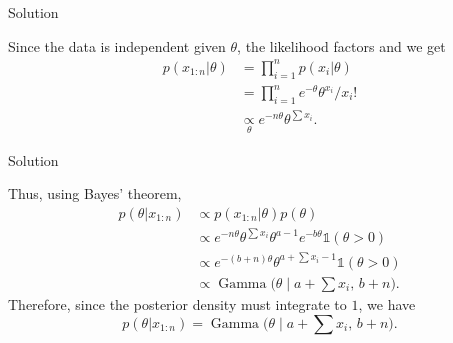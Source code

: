 \documentclass[
  ignorenonframetext,
]{beamer}
\DeclareMathOperator*{\Ga}{Gamma}
\newcommand{\I}{\mathds{1}}
\begin{document}
\begin{frame}{Solution}
\protect\hypertarget{solution}{}

Since the data is independent given \(\theta\), the likelihood factors
and we get \begin{align*}
p(x_{1:n}|\theta) & = \prod_{i = 1}^n p(x_i|\theta) \\
& = \prod_{i = 1}^n e^{-\theta} \theta^{x_i} / x_i! \\
& \underset{\theta}{\propto} e^{-n\theta} \theta^{\sum x_i}.
\end{align*}

\end{frame}

\begin{frame}{Solution}
\protect\hypertarget{solution-1}{}

Thus, using Bayes' theorem, \begin{align*}
p(\theta|x_{1:n}) &\propto p(x_{1:n}|\theta) p(\theta) \\
& \propto e^{-n\theta} \theta^{\sum x_i} \theta^{a-1} e^{-b\theta}\I(\theta>0) \\
& \propto e^{-(b+n)\theta} \theta^{a+\sum x_i-1}\I(\theta>0) \\
& \propto \Ga\big(\theta\mid a+\textstyle\sum x_i,\,b+n\big).
\end{align*} Therefore, since the posterior density must integrate to
\(1\), we have
\[p(\theta|x_{1:n}) =\Ga\big(\theta\mid a+\textstyle\sum x_i,\,b+n\big).\]

\end{frame}
\end{document}
